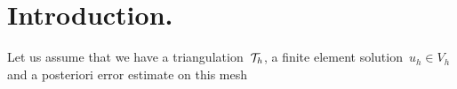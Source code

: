 \section{Introduction.}
%
\begin{print}
 Let us assume that we have a triangulation~${\cal T}_h$, a finite element solution~$u_h\in V_h$ and a posteriori error estimate on this mesh
  
\end{print}
